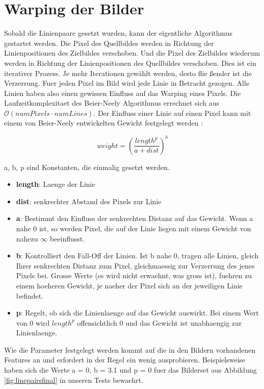\chapter{Warping der Bilder}

Sobald die Linienpaare gesetzt wurden, kann der eigentliche Algorithmus gestartet werden. Die Pixel
des Quellbildes werden in Richtung der Linienpositionen des Zielbildes verschoben. Und die Pixel
des Zielbildes wiederum werden in Richtung der Linienpositionen des Quellbildes verschoben.
Dies ist ein iterativer Prozess. Je mehr Iterationen gewählt werden, desto flie \ss ender ist
die Verzerrung.
Fuer jeden Pixel im Bild wird jede Linie in Betracht gezogen. Alle Linien haben also einen gewissen Einfluss auf
das Warping eines Pixels. Die Laufzeitkomplexitaet
des Beier-Neely Algorithmus errechnet sich aus
$\mathcal{O}(numPixels \cdot numLines)$.
Der Einfluss einer Linie auf einen Pixel kann mit einem
von Beier-Neely entwickelten Gewicht festgelegt werden
\cite{beierneely}:

\begin{equation}
	weight = \left(\frac{length^{p}}{a+dist}\right)^{b}
\end{equation}

a, b, p sind Konstanten, die einmalig gesetzt werden.

\begin{itemize}
	\item \textbf{length}: Laenge der Linie
	\item \textbf{dist}: senkrechter Abstand des Pixels zur Linie
	\item \textbf{a}: Bestimmt den Einfluss der senkrechten Distanz
	auf das Gewicht. Wenn a nahe 0 ist, so werden Pixel, die auf der
	Linie liegen mit einem Gewicht von nahezu $\infty$ beeinflusst.
	\item \textbf{b}: Kontrolliert den Fall-Off der Linien. Ist b
	nahe 0, tragen alle Linien, gleich Ihrer senkrechten Distanz zum
	Pixel, gleichmaessig zur Verzerrung des jenes Pixels bei.
	Grosse Werte (es wird nicht erwaehnt, was gross ist), fuehren
	zu einem hoeheren Gewicht, je naeher der Pixel sich an
	der jeweiligen Linie befindet.
	\item \textbf{p}: Regelt, ob sich die Linienlaenge auf das Gewicht
	auswirkt. Bei einem Wert von 0 wird $length^{p}$ offensichtlich 0
	und das Gewicht ist unabhaengig zur Linienlaenge.
\end{itemize}

Wie die Parameter festgelegt werden kommt auf die in den Bildern
vorhandenen Features an und erfordert in der Regel ein wenig
ausprobieren. Beispielsweise haben sich die Werte 
a = 0, b = 3.1 und p = 0 fuer das Bilderset aus Abbildung
\ref{fig:linepairsfinal} in unseren Tests bewaehrt.

